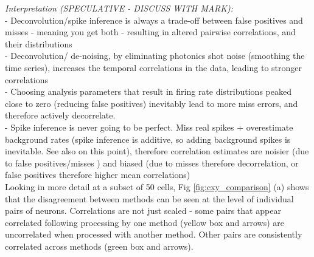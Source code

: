 \documentclass[a4paper,10pt,twocolumn]{article}
\begin{document}
\emph{Interpretation (SPECULATIVE - DISCUSS WITH MARK):}\\ 
\indent - Deconvolution/spike inference is always a trade-off between false positives and misses - meaning you get both - resulting in altered pairwise correlations, and their distributions\\
- Deconvolution/ de-noising, by eliminating photonics shot noise (smoothing the time series), increases the temporal correlations in the data, leading to stronger correlations\\
- Choosing analysis parameters that result in firing rate distributions peaked close to zero (reducing false positives) inevitably lead to more miss errors, and therefore actively decorrelate.\\
\indent - Spike inference is never going to be perfect. Miss real spikes + overestimate background rates (spike inference is additive, so adding background spikes is inevitable. See also \citealt{Ganmor2016-uf} on this point), therefore correlation estimates are noisier (due to false positives/misses ) and biased (due to misses therefore decorrelation, or false positives therefore higher mean correlations)\\







Looking in more detail at a subset of 50 cells, Fig \ref{fig:cxy_comparison} (a) shows that the disagreement between methods can be seen at the level of individual pairs of neurons.  Correlations are not just scaled - some pairs that appear correlated following processing by one method (yellow box and arrows) are uncorrelated when processed with another method. Other pairs are consistently correlated across methods (green box and arrows). 
\end{document}
